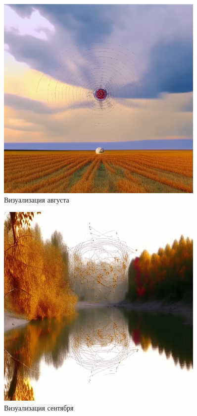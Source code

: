 \begin{figure}[H]
	\caption{Визуализация августа}
	\includegraphics[width=0.9\textwidth]{img/aug.jpeg}
\end{figure}

\begin{figure}[H]
	\caption{Визуализация сентября}
	\includegraphics[width=0.9\textwidth]{img/sep.jpeg}
\end{figure}

